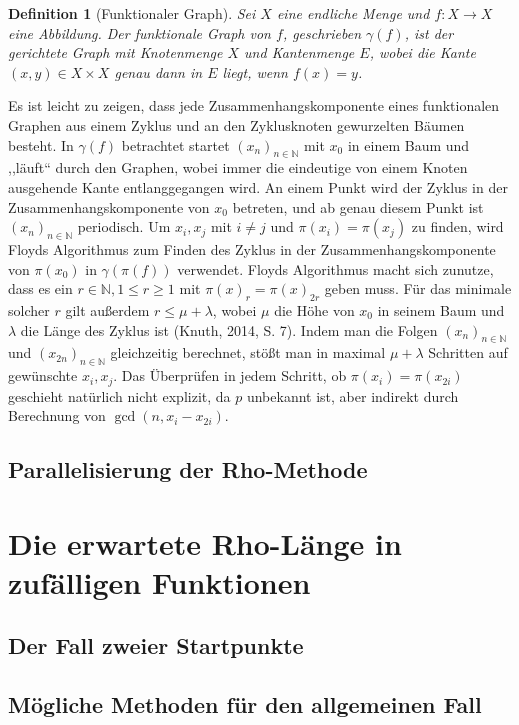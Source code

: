 \documentclass[a4paper, 10pt, ngerman]{article}
\newcommand{\N}{\mathbb{N}}
\newtheorem{definition}{Definition}
\begin{document}
\begin{definition}[Funktionaler Graph]
    Sei $X$ eine endliche Menge und $f: X \to X$ eine Abbildung. Der funktionale Graph von $f$, geschrieben $\gamma(f)$, ist der gerichtete Graph mit Knotenmenge $X$ und Kantenmenge $E$, wobei die Kante $(x, y) \in X \times X$ genau dann in $E$ liegt, wenn $f(x) = y$.
\end{definition}

\noindent Es ist leicht zu zeigen, dass jede Zusammenhangskomponente eines funktionalen Graphen aus einem Zyklus und an den Zyklusknoten gewurzelten Bäumen besteht. In $\gamma(f)$ betrachtet startet $(x_n)_{n \in \N}$ mit $x_0$ in einem Baum und ,,läuft`` durch den Graphen, wobei immer die eindeutige von einem Knoten ausgehende Kante entlanggegangen wird. An einem Punkt wird der Zyklus in der Zusammenhangskomponente von $x_0$ betreten, und ab genau diesem Punkt ist $(x_n)_{n \in \N}$ periodisch. Um $x_i, x_j$ mit $i \ne j$ und $\pi(x_i) = \pi(x_j)$ zu finden, wird Floyds Algorithmus zum Finden des Zyklus in der Zusammenhangskomponente von $\pi(x_0)$ in $\gamma(\pi(f))$ verwendet. Floyds Algorithmus macht sich zunutze, dass es ein $r \in \N, 1 \le r \ge 1$ mit $\pi(x)_r = \pi(x)_{2r}$ geben muss. Für das minimale solcher $r$ gilt außerdem $r \le \mu + \lambda$, wobei $\mu$ die Höhe von $x_0$ in seinem Baum und $\lambda$ die Länge des Zyklus ist (Knuth, 2014, S. 7). Indem man die Folgen $(x_n)_{n \in \N}$ und $(x_{2n})_{n \in \N}$ gleichzeitig berechnet, stößt man in maximal $\mu + \lambda$ Schritten auf gewünschte $x_i, x_j$. Das Überprüfen in jedem Schritt, ob $\pi(x_i) = \pi(x_{2i})$ geschieht natürlich nicht explizit, da $p$ unbekannt ist, aber indirekt durch Berechnung von $\gcd(n, x_i - x_{2i})$.

\subsection{Parallelisierung der Rho-Methode}

\section{Die erwartete Rho-Länge in zufälligen Funktionen}

\subsection{Der Fall zweier Startpunkte}

\subsection{Mögliche Methoden für den allgemeinen Fall}
\end{document}
